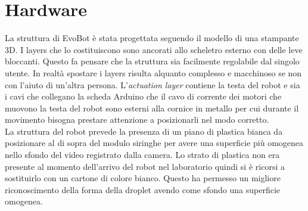 \section{Hardware}
La struttura di EvoBot è stata progettata seguendo il modello di una stampante 3D. I layers che lo costituiscono sono ancorati allo scheletro esterno con delle leve bloccanti. Questo fa pensare che la struttura sia facilmente regolabile dal singolo utente. In realtà spostare i layers risulta alquanto complesso e macchinoso se non con l'aiuto di un'altra persona. L'\emph{actuation layer} contiene la testa del robot e sia i cavi che collegano la scheda Arduino che il cavo di corrente dei motori che muovono la testa del robot sono esterni alla cornice in metallo per cui durante il movimento bisogna prestare attenzione a posizionarli nel modo corretto.
\\La struttura del robot prevede la presenza di un piano di plastica bianca da posizionare al di sopra del modulo siringhe per avere una superficie più omogenea nello sfondo del video registrato dalla camera. Lo strato di plastica non era presente al momento dell'arrivo del robot nel laboratorio quindi si è ricorsi a sostituirlo con un cartone di colore bianco. Questo ha permesso un migliore riconoscimento della forma della droplet avendo come sfondo una superficie omogenea. 

